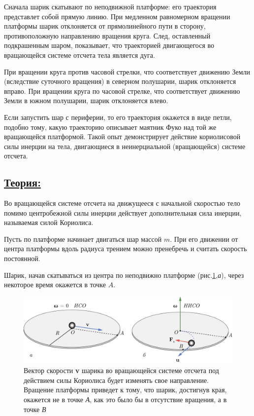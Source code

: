 \documentclass[14pt,a4paper,oneside]{extarticle}	%
\begin{document}
Сначала шарик скатывают по неподвижной платформе: его траектория представлет собой прямую линию.
При медленном равномерном вращении платформы шарик отклоняется от прямолинейного пути в сторону, противоположную направлению вращения круга.
След, оставленный подкрашенным шаром, показывает, что траекторией двигающегося во вращающейся системе отсчета тела является дуга.

При вращении круга против часовой стрелки, что соответствует движению Земли 
(вследствие суточного вращения) в северном полушарии, шарик отклоняется вправо.
При вращении круга по часовой стрелке, что соответствует движению Земли в южном полушарии, шарик отклоняется влево.

Если запустить шар с периферии, то его траектория окажется в виде петли, подобно тому, какую траекторию описывает маятник Фуко над той же вращающейся платформой.
Такой опыт демонстрирует действие кориолисовой силы инерции на тела, двигающиеся в неинерциальной (вращающейся) системе отсчета.

	\subsection*{\underline{Теория:}}
	
	Во вращающейся системе отсчета на движущееся с начальной скоростью тело помимо центробежной силы инерции действует дополнительная сила инерции, называемая силой Кориолиса.

	Пусть по платформе начинает двигаться шар массой $ m $.
При его движении от центра платформы вдоль радиуса трением можно пренебречь и считать скорость постоянной.
	
Шарик, начав скатываться из центра по неподвижно платформе (рис.\ref{Coriolis-3},\textit{а}), через некоторое время окажется в точке $ A $.

	\begin{figure}[H] 	
	\centering 	
	\includegraphics[width=1\linewidth]{Coriolis-3.png}
	\caption{Вектор скорости \textbf{v} шарика во вращающейся системе отсчета под действием силы Кориолиса будет изменять свое направление. Вращение платформы приведет к тому, что шарик, достигнув края, окажется не в точке \textit{А}, как это было бы в отсутствие вращения, а в точке \textit{В}}
	\label{Coriolis-3}
\end{figure}	
	
\end{document}

